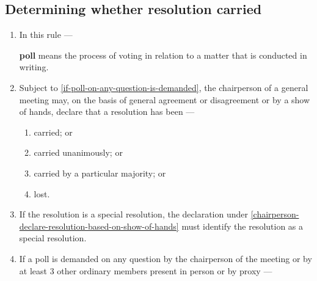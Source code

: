 \documentclass[../constitution.tex]{subfiles}
\begin{document}
\hypertarget{determining-whether-resolution-carried}{%
\subsection{Determining whether resolution carried}\label{determining-whether-resolution-carried}}

\begin{enumerate}

\item In this rule ---
  
  \textbf{poll} means the process of voting in relation to a matter that is conducted in writing.

\item Subject to  \ref{if-poll-on-any-question-is-demanded}, the chairperson of a general meeting may, on the basis of general agreement or disagreement or by a show of hands, declare that a resolution has been --- \label{chairperson-declare-resolution-based-on-show-of-hands}

  \begin{enumerate}
  
  \item carried; or
  \item carried unanimously; or
  \item carried by a particular majority; or
  \item lost.
  \end{enumerate}
\item If the resolution is a special resolution, the declaration under  \ref{chairperson-declare-resolution-based-on-show-of-hands} must identify the resolution as a special resolution.
\item If a poll is demanded on any question by the chairperson of the meeting or by at least 3 other ordinary members present in person or by proxy --- \label{if-poll-on-any-question-is-demanded}

  \begin{enumerate}
  

\end{enumerate}
\end{enumerate}
\end{document}
